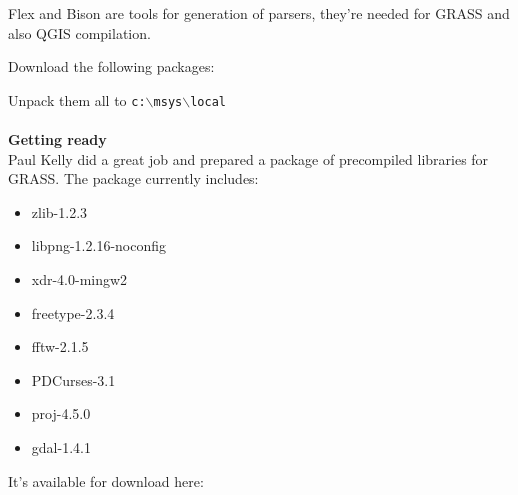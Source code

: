 Flex and Bison are tools for generation of parsers, they're needed for GRASS and also QGIS compilation.

Download the following packages:

	\begin{quotation}
	\end{quotation}

	\begin{quotation}
	\end{quotation}

	\begin{quotation}
	\end{quotation}

Unpack them all to \texttt{c:$\backslash$msys$\backslash$local}

\paragraph{}\textbf{Getting ready}\\

Paul Kelly did a great job and prepared a package of precompiled libraries for GRASS.
The package currently includes:

\begin{itemize}
\item zlib-1.2.3
\item libpng-1.2.16-noconfig
\item xdr-4.0-mingw2
\item freetype-2.3.4
\item fftw-2.1.5
\item PDCurses-3.1
\item proj-4.5.0
\item gdal-1.4.1
\end{itemize}

It's available for download here:

	\begin{quotation}
	\end{quotation}

